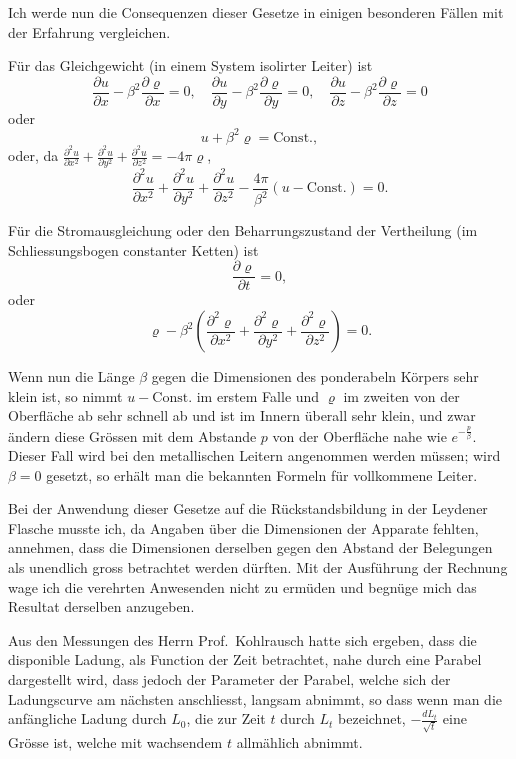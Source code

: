 \documentclass[12pt,a4paper]{book}
\theoremstyle{definition}
\theoremstyle{remark}
\begin{document}
Ich werde nun die Consequenzen dieser Gesetze in einigen besonderen Fällen mit der Erfahrung vergleichen.

Für das Gleichgewicht (in einem System isolirter Leiter) ist
\[
\frac{\partial u}{\partial x} - \beta^2 \frac{\partial \varrho}{\partial x} = 0, \quad
\frac{\partial u}{\partial y} - \beta^2 \frac{\partial \varrho}{\partial y} = 0, \quad
\frac{\partial u}{\partial z} - \beta^2 \frac{\partial \varrho}{\partial z} = 0
\]
oder
\[
u + \beta^2 \varrho = \text{Const.},
\]
oder, da $\frac{\partial^2 u}{\partial x^2} + \frac{\partial^2 u}{\partial y^2} + \frac{\partial^2 u}{\partial z^2} = -4\pi \varrho$,
\[
\frac{\partial^2 u}{\partial x^2} + \frac{\partial^2 u}{\partial y^2} + \frac{\partial^2 u}{\partial z^2} - \frac{4\pi}{\beta^2} (u - \text{Const.}) = 0.
\]

Für die Stromausgleichung oder den Beharrungszustand der Vertheilung (im Schliessungsbogen constanter Ketten) ist
\[
\frac{\partial \varrho}{\partial t} = 0,
\]
oder
\[
\varrho - \beta^2 \left(\frac{\partial^2 \varrho}{\partial x^2} + \frac{\partial^2 \varrho}{\partial y^2} + \frac{\partial^2 \varrho}{\partial z^2}\right) = 0.
\]

Wenn nun die Länge $\beta$ gegen die Dimensionen des ponderabeln Körpers sehr klein ist, so nimmt $u - \text{Const.}$ im erstem Falle und $\varrho$ im zweiten von der Oberfläche ab sehr schnell ab und ist im Innern überall sehr klein, und zwar ändern diese Grössen mit dem Abstande $p$ von der Oberfläche nahe wie $e^{-\frac{p}{\beta}}$. Dieser Fall wird bei den metallischen Leitern angenommen werden müssen; wird $\beta = 0$ gesetzt, so erhält man die bekannten Formeln für vollkommene Leiter.

Bei der Anwendung dieser Gesetze auf die Rückstandsbildung in der Leydener Flasche musste ich, da Angaben über die Dimensionen der Apparate fehlten, annehmen, dass die Dimensionen derselben gegen den Abstand der Belegungen als unendlich gross betrachtet werden dürften. Mit der Ausführung der Rechnung wage ich die verehrten Anwesenden nicht zu ermüden und begnüge mich das Resultat derselben anzugeben.

Aus den Messungen des Herrn Prof.~Kohlrausch hatte sich ergeben, dass die disponible Ladung, als Function der Zeit betrachtet, nahe durch eine Parabel dargestellt wird, dass jedoch der Parameter der Parabel, welche sich der Ladungscurve am nächsten anschliesst, langsam abnimmt, so dass wenn man die anfängliche Ladung durch $L_0$, die zur Zeit $t$ durch $L_t$ bezeichnet, $-\frac{dL_t}{\sqrt{t}}$ eine Grösse ist, welche mit wachsendem $t$ allmählich abnimmt.
\end{document}
